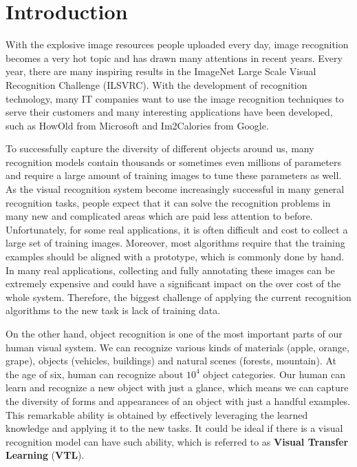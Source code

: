 \chapter{Introduction}\label{sec:intro}
With the explosive image resources people uploaded every day, image recognition becomes a very hot topic and has drawn many attentions in recent years. Every year, there are many inspiring results in the ImageNet Large Scale Visual Recognition Challenge (ILSVRC). 
With the development of recognition technology, many IT companies want to use the image recognition techniques to serve their customers and many interesting applications have been developed, such as HowOld from Microsoft and Im2Calories from Google.

To successfully capture the diversity of different objects around us, many recognition models contain thousands or sometimes even millions of parameters and require a large amount of training images to tune these parameters as well.
As the visual recognition system become increasingly successful in many general recognition tasks, people expect that it can solve the recognition problems in many new and complicated areas which are paid less attention to before.  
Unfortunately, for some real applications, it is often difficult and cost to collect a large set of training images. Moreover, most algorithms require that the training examples should be aligned with a prototype, which is commonly done by hand. In many real applications, collecting and fully annotating these images can be extremely expensive and could have a significant impact on the over cost of the whole system.
Therefore, the biggest challenge of applying the current recognition algorithms to the new task is lack of training data.

On the other hand, object recognition is one of the most important parts of our human visual system. We can recognize various kinds of materials (apple, orange, grape), objects (vehicles, buildings) and natural scenes (forests, mountain). At the age of six, human can recognize about $10^4$ object categories\cite{biederman1987recognition}. 
Our human can learn and recognize a new object with just a glance, which means we can capture the diversity of forms and appearances of an object with just a handful examples. This remarkable ability is obtained by effectively leveraging the learned knowledge and applying it to the new tasks. It could be ideal if there is a visual recognition model can have such ability, which is referred to as \textbf{Visual Transfer Learning} (\textbf{VTL}). 

